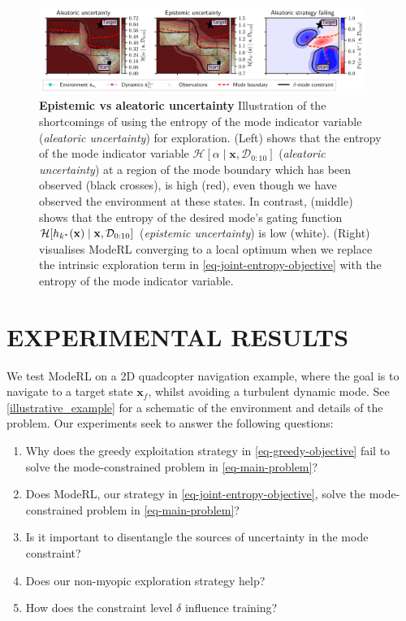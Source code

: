 \documentclass[twoside]{article}
\newcommand{\state}{\ensuremath{\mathbf{x}}}
\newcommand{\dataset}{\ensuremath{\mathcal{D}}}
\newcommand{\modeVar}{\ensuremath{\alpha}}
\newcommand{\gatingFunc}{\ensuremath{h}}
\begin{document}
\begin{figure}[t]
    \centering
    \includegraphics[width=0.95\textwidth]{../experiments/figures/uncertainty_comparison.pdf}
    \caption{\textbf{Epistemic vs aleatoric uncertainty} Illustration of the shortcomings of using the entropy of the mode indicator variable
    (\textit{aleatoric uncertainty}) for exploration.
    (Left) shows that the entropy of the mode indicator variable $\mathcal{H}[\modeVar \mid \state, \dataset_{0:10}]$ (\textit{aleatoric uncertainty}) at a region of the mode boundary
    which has been observed (black crosses), is high (red), even though we have observed the environment at these states.
    In contrast, (middle) shows that the entropy of the desired mode's gating function $\mathcal{H}[\gatingFunc_{\desiredMode}(\state) \mid \state, \dataset_{0:10}]$
    (\textit{epistemic uncertainty}) is low (white).
    (Right) visualises ModeRL converging to a local optimum when we replace the intrinsic exploration term in \cref{eq-joint-entropy-objective} with the
    entropy of the mode indicator variable.}
    \label{fig-uncertainty-comparison}
\end{figure}

\section{EXPERIMENTAL RESULTS}
\label{sec:org628d74d}
We test ModeRL on a 2D quadcopter navigation example, where the goal is to navigate to a target state \(\state_{f}\), whilst avoiding a turbulent dynamic mode.
See \cref{illustrative_example} for a schematic of the environment and details of the problem.
Our experiments seek to answer the following questions:
\begin{enumerate}
\item Why does the greedy exploitation strategy in \cref{eq-greedy-objective} fail to solve the mode-constrained problem in \cref{eq-main-problem}?
\item Does ModeRL, our strategy in \cref{eq-joint-entropy-objective}, solve the mode-constrained problem in \cref{eq-main-problem}?
\item Is it important to disentangle the sources of uncertainty in the mode constraint?
\item Does our non-myopic exploration strategy help?
\item How does the constraint level \(\delta\) influence training?
\end{enumerate}
\end{document}
